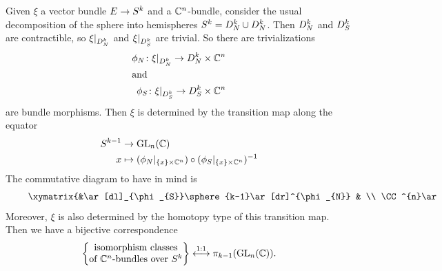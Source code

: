 \begin{construction}
Given $\xi$ a vector bundle $E\to S^{k}$ and a $\mathbb{C}^{n}$-bundle,
consider the usual decomposition of the sphere into hemispheres
$S^{k}=D^{k}_{N}\cup D^{k}_{N}$. Then $D^{k}_{N}$ and
$D^{k}_{S}$ are contractible, so $\xi|_{D^{k}_{N}}$ and
$\xi|_{D^{k}_{S}}$ are trivial. So there are trivializations
\begin{subequations}
  \begin{align}
\phi_{N}\colon\xi|_{D^{k}_{N}}\to D^{k}_{N}\times\mathbb{C}^{n}\\
\intertext{and}
\phi_{S}\colon\xi|_{D^{k}_{S}}\to D^{k}_{S}\times\mathbb{C}^{n}
  \end{align}
\end{subequations}
are bundle morphisms. Then $\xi$ is determined by the transition map
along the equator
\begin{equation}
\begin{split}
S^{k-1}&\to\operatorname{GL}_{n}(\mathbb{C})\\
x&\mapsto(\phi_{N}|_{\{x\}\times\mathbb{C}^{n}})\circ(\phi_{S}|_{\{x\}\times\mathbb{C}^{n}})^{-1}
\end{split}
\end{equation}
The commutative diagram to have in mind is
\begin{equation}
\vcenter{\xymatrix{&\ar[dl]_{\phi_{S}}\sphere{k-1}\ar[dr]^{\phi_{N}} & \\
\CC^{n}\ar[rr]^{\phi_{N}\circ\phi_{S}^{-1}} & & \CC^{n}}}
\end{equation}
Moreover, $\xi$ is also determined by the homotopy type of this
transition map. Then we have a bijective correspondence
\begin{equation}
\left\{\begin{matrix}\mbox{isomorphism classes}\\
\mbox{of $\mathbb{C}^{n}$-bundles over $S^{k}$}\end{matrix}\right\}\stackrel{1:1}{\longleftrightarrow}\pi_{k-1}(\operatorname{GL}_{n}(\mathbb{C})).
\end{equation}
\end{construction}

